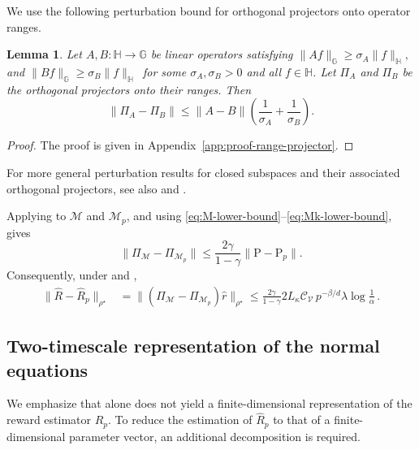 \documentclass{article}
\newtheorem{lemma}[proposition]{Lemma}
\theoremstyle{definition}
\theoremstyle{remark}
\theoremstyle{plain}
\newcommand{\MKQ}{\mathrm{P}}
\def\eqsp{\,}
\newcommand{\dsieve}{p}
\numberwithin{equation}{section}
\begin{document}
We use the following perturbation bound for orthogonal projectors onto operator ranges.
\begin{lemma}
\label{lem:range-projector}
Let \(A,B:\mathbb H\to\mathbb G\) be linear operators satisfying
\(
    \|Af\|_{\mathbb G}\geq\sigma_A\|f\|_{\mathbb H},\) and \(
    \|Bf\|_{\mathbb G}\geq\sigma_B\|f\|_{\mathbb{H}}\,
\) 
 for some \(\sigma_A,\sigma_B>0\) and all \(f\in\mathbb H\). Let \(\Pi_A\) and \(\Pi_B\) be the orthogonal projectors onto their ranges. Then
\begin{equation}
\label{eq:range-projector-perturbation}
    \|\Pi_A-\Pi_B\|
    \leq
    \|A-B\|
    \left(
        \frac{1}{\sigma_A}
        +
        \frac{1}{\sigma_B}
    \right).
\end{equation}
\end{lemma}
\begin{proof}
    The proof is given in Appendix~\ref{app:proof-range-projector}.
\end{proof}
For more general perturbation results for closed subspaces and their associated
orthogonal projectors, see also
\cite[Theorem~I.6.34]{kato1958perturbation} and
\cite[Lemma~221]{kato1966perturbation}.

Applying  to \(\mathcal M\) and \(\mathcal M_\dsieve\), and using \eqref{eq:M-lower-bound}--\eqref{eq:Mk-lower-bound}, gives
\begin{equation}
\label{eq:projector-M-Mk-bound}
    \|\Pi_{\mathcal M}-\Pi_{\mathcal M_\dsieve}\|
    \leq
    \frac{2\gamma}{1-\gamma}
    \|\MKQ-\MKQ_\dsieve\|.
\end{equation}
Consequently, under  and ,
\begin{align}
\label{eq:Galerkin-reward-term}
    \|\widehat R-\widehat R_\dsieve\|_{\rho^\star}
    & = \|(\Pi_{\mathcal M} - \Pi_{\mathcal{M}_\dsieve})\widehat{r}\|_{\rho^\star}\le
    \frac{2\gamma}{1-\gamma}2L_{\kappa}\mathcal{C}_{\mathcal{V}} \,\dsieve ^{-\beta/d}\lambda 
    \log\frac{1}{\alpha}
    \eqsp.
\end{align}



\subsection{Two-timescale representation of the normal equations}
\label{subsec:finite-dimensional-projection}
We emphasize that  alone does not yield a finite-dimensional representation of the reward estimator \(\widehat R_\dsieve\). To reduce the estimation of \(\widehat R_\dsieve\) to that of a finite-dimensional parameter vector, an additional decomposition is required.
\end{document}

